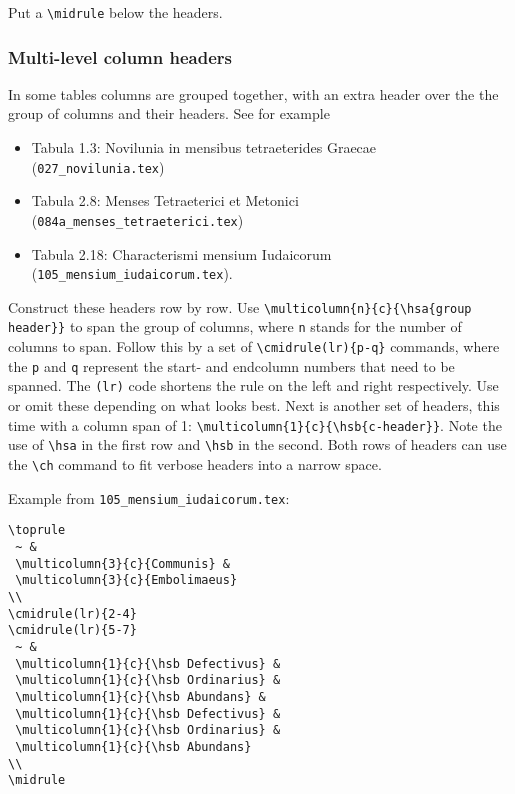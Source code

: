 \documentclass{report}
\begin{document}
Put a \verb+\midrule+ below the headers.

\subsubsection{Multi-level column headers}
In some tables columns are grouped together, with an extra header over
the the group of columns and their headers.
See for example
\begin{itemize}
\item Tabula 1.3: Novilunia in mensibus tetraeterides Graecae
(\verb+027_novilunia.tex+)
\item Tabula 2.8: Menses Tetraeterici et Metonici
(\verb+084a_menses_tetraeterici.tex+)
\item Tabula 2.18: Characterismi mensium Iudaicorum
(\verb+105_mensium_iudaicorum.tex+).
\end{itemize}

Construct these headers row by row.
Use \verb+\multicolumn{n}{c}{\hsa{group header}}+ to span the group of columns,
where \verb+n+ stands for the number of columns to span.
Follow this by a set of \verb+\cmidrule(lr){p-q}+ commands, where the
\verb+p+ and \verb+q+ represent the start- and endcolumn numbers
that need to be spanned. The \verb+(lr)+ code shortens the rule on the
left and right respectively. Use or omit these depending on what looks best.
Next is another set of headers, this time with a column span of 1:
\verb+\multicolumn{1}{c}{\hsb{c-header}}+.
Note the use of \verb+\hsa+ in the first row and \verb+\hsb+ in the second.
Both rows of headers can use the \verb+\ch+ command to fit verbose headers
into a narrow space.

Example from \verb+105_mensium_iudaicorum.tex+:
\begin{verbatim}
\toprule
 ~ &
 \multicolumn{3}{c}{Communis} &
 \multicolumn{3}{c}{Embolimaeus}
\\
\cmidrule(lr){2-4}
\cmidrule(lr){5-7} 
 ~ &
 \multicolumn{1}{c}{\hsb Defectivus} &
 \multicolumn{1}{c}{\hsb Ordinarius} &
 \multicolumn{1}{c}{\hsb Abundans} &
 \multicolumn{1}{c}{\hsb Defectivus} &
 \multicolumn{1}{c}{\hsb Ordinarius} &
 \multicolumn{1}{c}{\hsb Abundans}
\\
\midrule
\end{verbatim}

\end{document}

